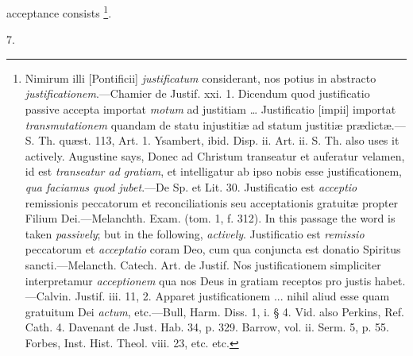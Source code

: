 acceptance consists \footnote{Nimirum illi [Pontificii]
\emph{justificatum} considerant, nos potius in abstracto \emph{justificationem}.—Chamier
de Justif. xxi. 1. Dicendum quod justificatio passive accepta importat
\emph{motum} ad justitiam … Justificatio [impii] importat \emph{transmutationem}
quandam de statu injustitiæ ad statum justitiæ prædictæ.—S. Th.
quæst. 113, Art. 1. Ysambert, ibid. Disp. ii. Art. ii. S. Th. also
uses it actively. Augustine says, Donec ad Christum transeatur et
auferatur velamen, id est \emph{transeatur ad gratiam}, et
intelligatur ab ipso nobis esse justificationem, \emph{qua faciamus quod
jubet}.—De Sp. et Lit. 30. Justificatio est \emph{acceptio}
remissionis peccatorum et reconciliationis seu acceptationis gratuitæ
propter Filium Dei.—Melanchth. Exam. (tom. 1, f. 312). In this
passage the word is taken \emph{passively}; but in the following, \emph{actively}.
Justificatio est \emph{remissio} peccatorum et \emph{acceptatio} coram
Deo, cum qua conjuncta est donatio Spiritus sancti.—Melancth. Catech.
Art. de Justif. Nos justificationem simpliciter interpretamur \emph{acceptionem}
qua nos Deus in gratiam receptos pro justis habet.—Calvin. Justif.
iii. 11, 2. Apparet justificationem ... nihil aliud esse quam
gratuitum Dei \emph{actum}, etc.—Bull, Harm. Diss. 1, i. § 4. Vid.
also Perkins, Ref. Cath. 4. Davenant de Just. Hab. 34, p. 329. Barrow,
vol. ii. Serm. 5, p. 55. Forbes, Inst. Hist. Theol. viii. 23, etc.
etc.}.

7.

